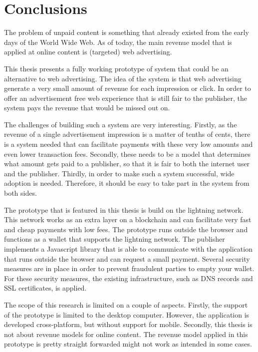 \chapter{Conclusions}
\label{cha:conclusion}

The problem of unpaid content is something that already existed from the early days of the World Wide Web. As of today, the main revenue model that is applied at online content is (targeted) web advertising.


This thesis presents a fully working prototype of system that could be an alternative to web advertising. The idea of the system is that web advertising generate a very small amount of revenue for each impression or click. In order to offer an advertisement free web experience that is still fair to the publisher, the system pays the revenue that would be missed out on. 

The challenges of building such a system are very interesting. Firstly, as the revenue of a single advertisement impression is a matter of tenths of cents, there is a system needed that can facilitate payments with these very low amounts and even lower transaction fees. Secondly, these needs to be a model that determines what amount gets paid to a publisher, so that it is fair to both the internet user and the publisher. Thirdly, in order to make such a system successful, wide adoption is needed. Therefore, it should be easy to take part in the system from both sides.

The prototype that is featured in this thesis is build on the lightning network. This network works as an extra layer on a blockchain and can facilitate very fast and cheap payments with low fees. The prototype runs outside the browser and functions as a wallet that supports the lightning network. The publisher implements a Javascript library that is able to communicate with the application that runs outside the browser and can request a small payment. Several security measures are in place in order to prevent fraudulent parties to empty your wallet. For these security measures, the existing infrastructure, such as DNS records and SSL certificates, is applied. 

The scope of this research is limited on a couple of aspects. Firstly, the support of the prototype is limited to the desktop computer. However, the application is developed cross-platform, but without support for mobile. Secondly, this thesis is not about revenue models for online content. The revenue model applied in this prototype is pretty straight forwarded might not work as intended in some cases. 

